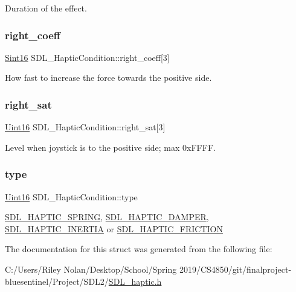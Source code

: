 Duration of the effect. \mbox{\label{struct_s_d_l___haptic_condition_a3de7f164ef88841255535387d0f100b6}} 
\subsubsection{\texorpdfstring{right\_coeff}{right\_coeff}}
{\footnotesize\ttfamily \mbox{\hyperlink{_s_d_l__stdinc_8h_a9d0257032c0e146ab6121bf0122712f5}{Sint16}} S\+D\+L\+\_\+\+Haptic\+Condition\+::right\+\_\+coeff\mbox{[}3\mbox{]}}

How fast to increase the force towards the positive side. \mbox{\label{struct_s_d_l___haptic_condition_a90427a1e0d464b4b53abc1d419c97b2e}} 
\subsubsection{\texorpdfstring{right\_sat}{right\_sat}}
{\footnotesize\ttfamily \mbox{\hyperlink{_s_d_l__stdinc_8h_a31fcc0a076c9068668173ee26d33e42b}{Uint16}} S\+D\+L\+\_\+\+Haptic\+Condition\+::right\+\_\+sat\mbox{[}3\mbox{]}}

Level when joystick is to the positive side; max 0x\+F\+F\+FF. \mbox{\label{struct_s_d_l___haptic_condition_a7be55a9a86c05dd1a54a3006781cfa6f}} 
\subsubsection{\texorpdfstring{type}{type}}
{\footnotesize\ttfamily \mbox{\hyperlink{_s_d_l__stdinc_8h_a31fcc0a076c9068668173ee26d33e42b}{Uint16}} S\+D\+L\+\_\+\+Haptic\+Condition\+::type}

\mbox{\hyperlink{_s_d_l__haptic_8h_a3b52d4700380085e2b5d87bb20320fb1}{S\+D\+L\+\_\+\+H\+A\+P\+T\+I\+C\+\_\+\+S\+P\+R\+I\+NG}}, \mbox{\hyperlink{_s_d_l__haptic_8h_a69522f261973e3ea4273486141320a87}{S\+D\+L\+\_\+\+H\+A\+P\+T\+I\+C\+\_\+\+D\+A\+M\+P\+ER}}, \mbox{\hyperlink{_s_d_l__haptic_8h_a14b807471589120395aec28293cf6642}{S\+D\+L\+\_\+\+H\+A\+P\+T\+I\+C\+\_\+\+I\+N\+E\+R\+T\+IA}} or \mbox{\hyperlink{_s_d_l__haptic_8h_a98a5011311168d63921aaac21403a4d8}{S\+D\+L\+\_\+\+H\+A\+P\+T\+I\+C\+\_\+\+F\+R\+I\+C\+T\+I\+ON}} 

The documentation for this struct was generated from the following file\+:\begin{DoxyCompactItemize}
\item 
C\+:/\+Users/\+Riley Nolan/\+Desktop/\+School/\+Spring 2019/\+C\+S4850/git/finalproject-\/bluesentinel/\+Project/\+S\+D\+L2/\mbox{\hyperlink{_s_d_l__haptic_8h}{S\+D\+L\+\_\+haptic.\+h}}\end{DoxyCompactItemize}
